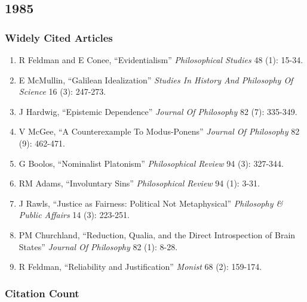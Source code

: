 \documentclass[
  10pt,
  letterpaper,
  DIV=11,
  numbers=noendperiod,
  twoside]{scrartcl}
\providecommand{\tightlist}{%
  \setlength{\itemsep}{0pt}\setlength{\parskip}{0pt}}\usepackage{longtable,booktabs,array}
\begin{document}
\newpage

\subsection{1985}\label{section-9}

\subsubsection*{Widely Cited Articles}\label{widely-cited-articles-9}

\begin{enumerate}
\def\labelenumi{\arabic{enumi}.}
\tightlist
\item
  R Feldman and E Conee, ``Evidentialism'' \emph{Philosophical Studies}
  48 (1): 15-34.
\item
  E McMullin, ``Galilean Idealization'' \emph{Studies In History And
  Philosophy Of Science} 16 (3): 247-273.
\item
  J Hardwig, ``Epistemic Dependence'' \emph{Journal Of Philosophy} 82
  (7): 335-349.
\item
  V McGee, ``A Counterexample To Modus-Ponens'' \emph{Journal Of
  Philosophy} 82 (9): 462-471.
\item
  G Boolos, ``Nominalist Platonism'' \emph{Philosophical Review} 94 (3):
  327-344.
\item
  RM Adams, ``Involuntary Sins'' \emph{Philosophical Review} 94 (1):
  3-31.
\item
  J Rawls, ``Justice as Fairness: Political Not Metaphysical''
  \emph{Philosophy \& Public Affairs} 14 (3): 223-251.
\item
  PM Churchland, ``Reduction, Qualia, and the Direct Introspection of
  Brain States'' \emph{Journal Of Philosophy} 82 (1): 8-28.
\item
  R Feldman, ``Reliability and Justification'' \emph{Monist} 68 (2):
  159-174.
\end{enumerate}

\subsubsection*{Citation Count}\label{citation-count-9}
\end{document}

